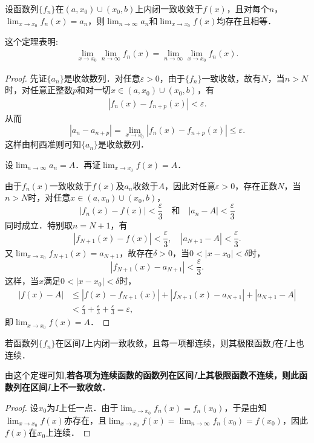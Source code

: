 \documentclass[../../main.tex]{subfiles}%
\begin{document}
\begin{theorem}\label{theorem:定理13.8123}
设函数列\(\{f_n\}\)在\((a, x_0) \cup (x_0, b)\)上内闭一致收敛于\(f(x)\)，且对每个\(n\)，\(\lim_{x \to x_0} f_n(x) = a_n\)，则\(\lim_{n \to \infty} a_n\)和\(\lim_{x \to x_0} f(x)\)均存在且相等．
\end{theorem}
\begin{remark}
这个定理表明:
\begin{align*}
\underset{x\rightarrow x_0}{\lim}\underset{n\rightarrow \infty}{\lim}f_n\left( x \right) =\underset{n\rightarrow \infty}{\lim}\underset{x\rightarrow x_0}{\lim}f_n\left( x \right) .
\end{align*}
\end{remark}
\begin{proof}
先证\(\{a_n\}\)是收敛数列．对任意\(\varepsilon > 0\)，由于\(\{f_n\}\)一致收敛，故有\(N\)，当\(n > N\)时，对任意正整数\(p\)和对一切\(x \in (a, x_0) \cup (x_0, b)\)，有
\begin{align}
|f_n(x) - f_{n + p}(x)| < \varepsilon. \label{eq::--1}
\end{align}
从而
\[
|a_n - a_{n + p}| = \lim_{x \to x_0} |f_n(x) - f_{n + p}(x)| \leqslant \varepsilon.
\]
这样由柯西准则可知\(\{a_n\}\)是收敛数列．

设\(\lim_{n \to \infty} a_n = A\)．再证\(\lim_{x \to x_0} f(x) = A\)．

由于\(f_n(x)\)一致收敛于\(f(x)\)及\(a_n\)收敛于\(A\)，因此对任意\(\varepsilon > 0\)，存在正数\(N\)，当\(n > N\)时，对任意\(x \in (a, x_0) \cup (x_0, b)\)，
\[
|f_n(x) - f(x)| < \frac{\varepsilon}{3} \quad \text{和} \quad |a_n - A| < \frac{\varepsilon}{3}
\]
同时成立．特别取\(n = N + 1\)，有
\[
|f_{N + 1}(x) - f(x)| < \frac{\varepsilon}{3}, \quad |a_{N + 1} - A| < \frac{\varepsilon}{3}.
\]
又\(\lim_{x \to x_0} f_{N + 1}(x) = a_{N + 1}\)，故存在\(\delta > 0\)，当\(0 < |x - x_0| < \delta\)时，
\[
|f_{N + 1}(x) - a_{N + 1}| < \frac{\varepsilon}{3}.
\]
这样，当\(x\)满足\(0 < |x - x_0| < \delta\)时，
\begin{align*}
|f(x) - A| &\leqslant |f(x) - f_{N + 1}(x)| + |f_{N + 1}(x) - a_{N + 1}| + |a_{N + 1} - A| \\
&< \frac{\varepsilon}{3} + \frac{\varepsilon}{3} + \frac{\varepsilon}{3} = \varepsilon,
\end{align*}
即\(\lim_{x \to x_0} f(x) = A\)．
\end{proof}

\begin{theorem}[连续性]\label{theorem:定理13.98648}
若函数列\(\{f_n\}\)在区间\(I\)上内闭一致收敛，且每一项都连续，则其极限函数\(f\)在\(I\)上也连续．
\end{theorem}
\begin{remark}
由这个定理可知,\textbf{若各项为连续函数的函数列在区间\(I\)上其极限函数不连续，则此函数列在区间\(I\)上不一致收敛．}
\end{remark}
\begin{proof}
设\(x_0\)为\(I\)上任一点．由于\(\lim_{x \to x_0} f_n(x) = f_n(x_0)\)，于是由知\(\lim_{x \to x_0} f(x)\)亦存在，且\(\lim_{x \to x_0} f(x) = \lim_{n \to \infty} f_n(x_0) = f(x_0)\)，因此\(f(x)\)在\(x_0\)上连续．
\end{proof}
\end{document}

